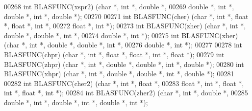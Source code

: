 \begin{DoxyCode}
00268 \textcolor{keywordtype}{int} BLASFUNC(xspr2) (\textcolor{keywordtype}{char} *, \textcolor{keywordtype}{int} *, \textcolor{keywordtype}{double}  *,
00269              \textcolor{keywordtype}{double} *, \textcolor{keywordtype}{int} *, \textcolor{keywordtype}{double} *, \textcolor{keywordtype}{int} *, \textcolor{keywordtype}{double} *);
00270 
00271 \textcolor{keywordtype}{int} BLASFUNC(cher) (\textcolor{keywordtype}{char} *, \textcolor{keywordtype}{int} *, \textcolor{keywordtype}{float}   *, \textcolor{keywordtype}{float}  *, \textcolor{keywordtype}{int} *,
00272             \textcolor{keywordtype}{float}  *, \textcolor{keywordtype}{int} *);
00273 \textcolor{keywordtype}{int} BLASFUNC(zher) (\textcolor{keywordtype}{char} *, \textcolor{keywordtype}{int} *, \textcolor{keywordtype}{double}  *, \textcolor{keywordtype}{double} *, \textcolor{keywordtype}{int} *,
00274             \textcolor{keywordtype}{double} *, \textcolor{keywordtype}{int} *);
00275 \textcolor{keywordtype}{int} BLASFUNC(xher) (\textcolor{keywordtype}{char} *, \textcolor{keywordtype}{int} *, \textcolor{keywordtype}{double}  *, \textcolor{keywordtype}{double} *, \textcolor{keywordtype}{int} *,
00276             \textcolor{keywordtype}{double} *, \textcolor{keywordtype}{int} *);
00277 
00278 \textcolor{keywordtype}{int} BLASFUNC(chpr) (\textcolor{keywordtype}{char} *, \textcolor{keywordtype}{int} *, \textcolor{keywordtype}{float}   *, \textcolor{keywordtype}{float}  *, \textcolor{keywordtype}{int} *, \textcolor{keywordtype}{float}  *);
00279 \textcolor{keywordtype}{int} BLASFUNC(zhpr) (\textcolor{keywordtype}{char} *, \textcolor{keywordtype}{int} *, \textcolor{keywordtype}{double}  *, \textcolor{keywordtype}{double} *, \textcolor{keywordtype}{int} *, \textcolor{keywordtype}{double} *);
00280 \textcolor{keywordtype}{int} BLASFUNC(xhpr) (\textcolor{keywordtype}{char} *, \textcolor{keywordtype}{int} *, \textcolor{keywordtype}{double}  *, \textcolor{keywordtype}{double} *, \textcolor{keywordtype}{int} *, \textcolor{keywordtype}{double} *);
00281 
00282 \textcolor{keywordtype}{int} BLASFUNC(cher2) (\textcolor{keywordtype}{char} *, \textcolor{keywordtype}{int} *, \textcolor{keywordtype}{float}   *,
00283              \textcolor{keywordtype}{float}  *, \textcolor{keywordtype}{int} *, \textcolor{keywordtype}{float}  *, \textcolor{keywordtype}{int} *, \textcolor{keywordtype}{float}  *, \textcolor{keywordtype}{int} *);
00284 \textcolor{keywordtype}{int} BLASFUNC(zher2) (\textcolor{keywordtype}{char} *, \textcolor{keywordtype}{int} *, \textcolor{keywordtype}{double}  *,
00285              \textcolor{keywordtype}{double} *, \textcolor{keywordtype}{int} *, \textcolor{keywordtype}{double} *, \textcolor{keywordtype}{int} *, \textcolor{keywordtype}{double} *, \textcolor{keywordtype}{int} *);

\end{DoxyCode}
